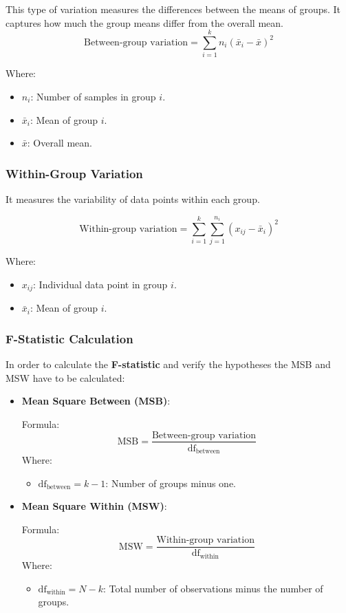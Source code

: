This type of variation measures the differences between the means of groups. It
captures how much the group means differ from the overall mean.
\[
\text{Between-group \  variation} = \sum_{i=1}^{k} n_i (\bar{x}_i - \bar{x})^2
\]

\noindent \noindent Where:
\begin{itemize}
    \item \(n_i\): Number of samples in group \(i\).
    \item \(\bar{x}_i\): Mean of group \(i\).
    \item \(\bar{x}\): Overall mean.
\end{itemize}


\subsubsection*{Within-Group Variation}
It measures the variability of data points within each group.

\[
\text{Within-group  \ variation} = \sum_{i=1}^{k} \sum_{j=1}^{n_i} (x_{ij} - \bar{x}_i)^2
\]

\noindent \noindent Where:
\begin{itemize}
    \item \(x_{ij}\): Individual data point in group \(i\).
    \item \(\bar{x}_i\): Mean of group \(i\).
\end{itemize}



\subsubsection*{F-Statistic Calculation}
In order to calculate the \textbf{F-statistic} and verify the hypotheses
the MSB and MSW have to be calculated:

\begin{itemize}
    \item \textbf{Mean Square Between (MSB)}:
    
    Formula:
    \[
    \text{MSB} = \frac{\text{Between-group variation}}{\text{df}_{\text{between}}}
    \]
    \noindent \noindent Where:
    \begin{itemize}
        \item \( \text{df}_{\text{between}} = k - 1 \): Number of groups minus one.
    \end{itemize}
\end{itemize}

\begin{itemize}
    \item \textbf{Mean Square Within (MSW)}:
    
    Formula:
    \[
    \text{MSW} = \frac{\text{Within-group \ variation}}{\text{df}_{\text{within}}}
    \]
    \noindent \noindent Where:
    \begin{itemize}
        \item \( \text{df}_{\text{within}} = N - k \): Total number of observations minus the number of groups.
    \end{itemize}
\end{itemize}


